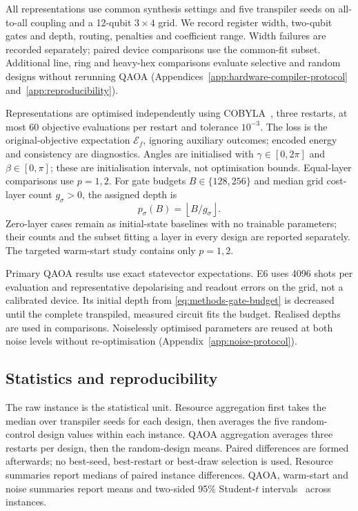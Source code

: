 \documentclass[a4paper,onecolumn,11pt,unpublished]{quantumarticle}
\theoremstyle{remark}
\begin{document}
All representations use common synthesis settings and five transpiler seeds
on all-to-all coupling and a 12-qubit $3\times4$ grid. We record register
width, two-qubit gates and depth, routing, penalties and coefficient range.
Width failures are recorded separately; paired device comparisons use the
common-fit subset. Additional line, ring and heavy-hex comparisons evaluate
selective and random designs without rerunning QAOA
(Appendices~\ref{app:hardware-compiler-protocol} and~\ref{app:reproducibility}).

Representations are optimised independently using COBYLA~\cite{Powell1994},
three restarts,
at most 60 objective evaluations per restart and tolerance $10^{-3}$.
The loss is the original-objective expectation $\mathcal E_f$, ignoring
auxiliary outcomes; encoded energy and consistency are diagnostics.
Angles are initialised with $\gamma\in[0,2\pi]$ and $\beta\in[0,\pi]$;
these are initialisation intervals, not optimisation bounds. Equal-layer
comparisons use $p=1,2$. For gate budgets $B\in\{128,256\}$ and median
grid cost-layer count $g_\sigma>0$, the assigned depth is
\begin{equation}
 p_\sigma(B)=\left\lfloor B/g_\sigma\right\rfloor.
 \label{eq:methods-gate-budget}
\end{equation}
Zero-layer cases remain as initial-state baselines with no trainable
parameters; their counts and the subset fitting a layer in every design are
reported separately. The targeted warm-start study contains only $p=1,2$.

Primary QAOA results use exact statevector expectations. E6 uses 4096 shots
per evaluation and representative depolarising and readout errors on the grid,
not a calibrated device. Its initial depth from
\cref{eq:methods-gate-budget} is decreased until the complete transpiled,
measured circuit fits the budget. Realised depths are used in comparisons.
Noiselessly optimised parameters are reused at both noise levels without
re-optimisation (Appendix~\ref{app:noise-protocol}).

\subsection{Statistics and reproducibility}
\label{sec:statistics-reproducibility}

The raw instance is the statistical unit. Resource aggregation first takes
the median over transpiler seeds for each design, then averages the five
random-control design values within each instance. QAOA aggregation averages
three restarts per design, then the random-design means. Paired differences
are formed afterwards; no best-seed, best-restart or best-draw selection is
used. Resource summaries report medians of paired instance differences.
QAOA, warm-start and noise summaries report means and two-sided 95\%
Student-$t$ intervals~\cite{Student1908} across instances.
\end{document}
